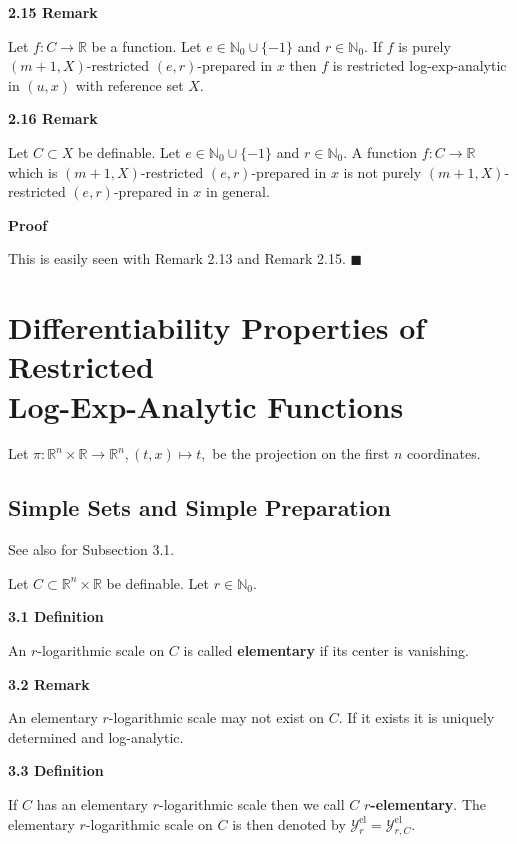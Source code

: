 \documentclass[12pt]{article}
\def\vs{\vspace}
\def\ma{\mathcal}
\begin{document}
\vs{0.5cm}
{\bf2.15 Remark}

\vs{0.1cm}
Let $f:C \to \mathbb{R}$ be a function. Let $e \in \mathbb{N}_0 \cup \{-1\}$ and $r \in \mathbb{N}_0$. If $f$ is purely $(m+1,X)$-restricted $(e,r)$-prepared in $x$ then $f$ is restricted log-exp-analytic in $(u,x)$ with reference set $X$.

\vs{0.5cm}
{\bf2.16 Remark}

\vs{0.1cm}
Let $C \subset X$ be definable. Let $e \in \mathbb{N}_0 \cup \{-1\}$ and $r \in \mathbb{N}_0$. A function $f:C \to \mathbb{R}$ which is $(m+1,X)$-restricted $(e,r)$-prepared in $x$ is not purely $(m+1,X)$-restricted $(e,r)$-prepared in $x$ in general.

\vs{0.3cm}
{\bf Proof}

\vs{0.1cm}
This is easily seen with Remark 2.13 and Remark 2.15. \hfill$\blacksquare$


\section{Differentiability Properties of Restricted \\
	Log-Exp-Analytic Functions}

Let $\pi:\mathbb{R}^n \times \mathbb{R} \to \mathbb{R}^n, (t,x) \mapsto t,$ be the projection on the first $n$ coordinates.

\subsection{Simple Sets and Simple Preparation}

See also \cite{7} for Subsection 3.1.

\vs{0.4cm}
Let $C \subset \mathbb{R}^n \times \mathbb{R}$ be definable. Let $r \in \mathbb{N}_{0}$.

\vs{0.5cm} 
{\bf3.1 Definition}

\vs{0.1cm}
An $r$-logarithmic scale on $C$ is called \textbf{elementary} if its center is vanishing.

\vs{0.5cm}
{\bf3.2 Remark}

\vs{0.1cm}
An elementary $r$-logarithmic scale may not exist on $C$. If it exists it is uniquely determined and log-analytic.

\vs{0.5cm}
{\bf3.3 Definition}

\vs{0.1cm}
If $C$ has an elementary $r$-logarithmic scale then we call $C$ {\bf $r$-elementary}. The elementary $r$-logarithmic scale on $C$ is then denoted by $\ma{Y}_r^\mathrm{el}=\ma{Y}_{r,C}^\mathrm{el}$.
\end{document}
